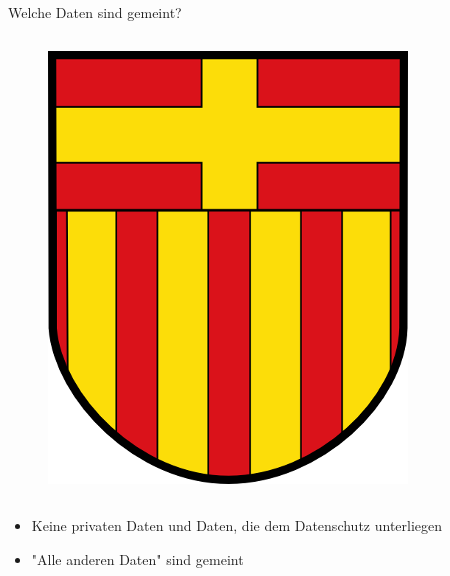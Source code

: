 \begin{frame}[t]{Welche Daten sind gemeint?}
\begin{columns}
  \begin{figure}[h]
   \centering
   \includegraphics[scale=0.3]{section_open_data_flag_paderborn.png}
  \end{figure}
 \end{columns}
 
 \begin{block}{}
 \begin{itemize}
  \item Keine privaten Daten und Daten, die dem Datenschutz unterliegen
  \item "Alle anderen Daten" sind gemeint
 \end{itemize}
 \end{block}
\end{frame}


